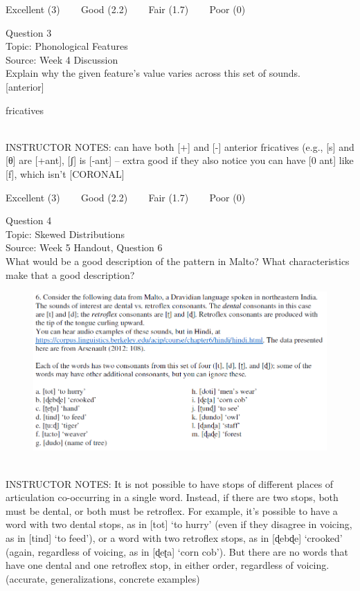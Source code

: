 \documentclass[12pt]{article}
\begin{document}
\vfill
Excellent (3) ~~~ Good (2.2) ~~~ Fair (1.7) ~~~ Poor (0)
\newpage

{\large Question 3}\\

Topic: Phonological Features\\
Source: Week 4 Discussion\\

Explain why the given feature's value varies across this set of sounds.\\

{[anterior]}

fricatives


~\\
INSTRUCTOR NOTES: can have both [+] and [-] anterior fricatives (e.g., [s] and [θ] are [+ant], [ʃ] is [-ant] -- extra good if they also notice you can have [0 ant] like [f], which isn't [CORONAL]


\vfill
Excellent (3) ~~~ Good (2.2) ~~~ Fair (1.7) ~~~ Poor (0)
\newpage

{\large Question 4}\\

Topic: Skewed Distributions\\
Source: Week 5 Handout, Question 6\\

What would be a good description of the pattern in Malto? What characteristics make that a good description?\\

\begin{figure}[H]
\includegraphics{../images/malto.png}
\end{figure}

~\\
INSTRUCTOR NOTES: It is not possible to have stops of different places of articulation co-occurring in a single word. Instead, if there are two stops, both must be dental, or both must be retroflex. For example, it’s possible to have a word with two dental stops, as in [tot] ‘to hurry’ (even if they disagree in voicing, as in [tind] ‘to feed’), or a word with two retroflex stops, as in [ɖebɖe] ‘crooked’ (again, regardless of voicing, as in [ɖeʈa] ‘corn cob’). But there are no words that have one dental and one retroflex stop, in either order, regardless of voicing. (accurate, generalizations, concrete examples)
\end{document}
